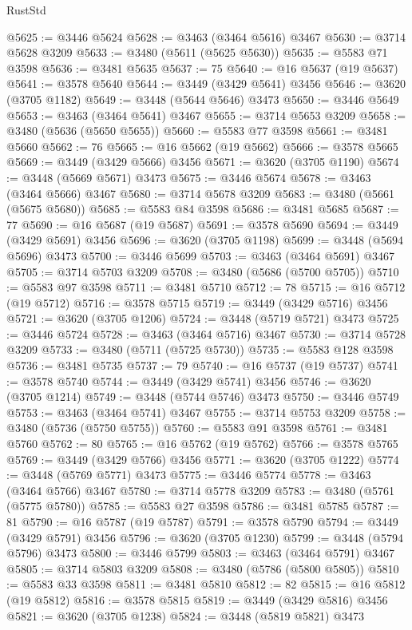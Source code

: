 \begin{lexlean}{RustStd}
\begin{coremodule}
{{{{{{{{{{{{{{{{{{{@5625 := @3446 @5624
@5628 := @3463 (@3464 @5616) @3467
@5630 := @3714 @5628 @3209
@5633 := @3480 (@5611 (@5625 @5630))
@5635 := @5583 @71 @3598
@5636 := @3481 @5635
@5637 := 75
@5640 := @16 @5637 (@19 @5637)
@5641 := @3578 @5640
@5644 := @3449 (@3429 @5641) @3456
@5646 := @3620 (@3705 @1182)
@5649 := @3448 (@5644 @5646) @3473
@5650 := @3446 @5649
@5653 := @3463 (@3464 @5641) @3467
@5655 := @3714 @5653 @3209
@5658 := @3480 (@5636 (@5650 @5655))
@5660 := @5583 @77 @3598
@5661 := @3481 @5660
@5662 := 76
@5665 := @16 @5662 (@19 @5662)
@5666 := @3578 @5665
@5669 := @3449 (@3429 @5666) @3456
@5671 := @3620 (@3705 @1190)
@5674 := @3448 (@5669 @5671) @3473
@5675 := @3446 @5674
@5678 := @3463 (@3464 @5666) @3467
@5680 := @3714 @5678 @3209
@5683 := @3480 (@5661 (@5675 @5680))
@5685 := @5583 @84 @3598
@5686 := @3481 @5685
@5687 := 77
@5690 := @16 @5687 (@19 @5687)
@5691 := @3578 @5690
@5694 := @3449 (@3429 @5691) @3456
@5696 := @3620 (@3705 @1198)
@5699 := @3448 (@5694 @5696) @3473
@5700 := @3446 @5699
@5703 := @3463 (@3464 @5691) @3467
@5705 := @3714 @5703 @3209
@5708 := @3480 (@5686 (@5700 @5705))
@5710 := @5583 @97 @3598
@5711 := @3481 @5710
@5712 := 78
@5715 := @16 @5712 (@19 @5712)
@5716 := @3578 @5715
@5719 := @3449 (@3429 @5716) @3456
@5721 := @3620 (@3705 @1206)
@5724 := @3448 (@5719 @5721) @3473
@5725 := @3446 @5724
@5728 := @3463 (@3464 @5716) @3467
@5730 := @3714 @5728 @3209
@5733 := @3480 (@5711 (@5725 @5730))
@5735 := @5583 @128 @3598
@5736 := @3481 @5735
@5737 := 79
@5740 := @16 @5737 (@19 @5737)
@5741 := @3578 @5740
@5744 := @3449 (@3429 @5741) @3456
@5746 := @3620 (@3705 @1214)
@5749 := @3448 (@5744 @5746) @3473
@5750 := @3446 @5749
@5753 := @3463 (@3464 @5741) @3467
@5755 := @3714 @5753 @3209
@5758 := @3480 (@5736 (@5750 @5755))
@5760 := @5583 @91 @3598
@5761 := @3481 @5760
@5762 := 80
@5765 := @16 @5762 (@19 @5762)
@5766 := @3578 @5765
@5769 := @3449 (@3429 @5766) @3456
@5771 := @3620 (@3705 @1222)
@5774 := @3448 (@5769 @5771) @3473
@5775 := @3446 @5774
@5778 := @3463 (@3464 @5766) @3467
@5780 := @3714 @5778 @3209
@5783 := @3480 (@5761 (@5775 @5780))
@5785 := @5583 @27 @3598
@5786 := @3481 @5785
@5787 := 81
@5790 := @16 @5787 (@19 @5787)
@5791 := @3578 @5790
@5794 := @3449 (@3429 @5791) @3456
@5796 := @3620 (@3705 @1230)
@5799 := @3448 (@5794 @5796) @3473
@5800 := @3446 @5799
@5803 := @3463 (@3464 @5791) @3467
@5805 := @3714 @5803 @3209
@5808 := @3480 (@5786 (@5800 @5805))
@5810 := @5583 @33 @3598
@5811 := @3481 @5810
@5812 := 82
@5815 := @16 @5812 (@19 @5812)
@5816 := @3578 @5815
@5819 := @3449 (@3429 @5816) @3456
@5821 := @3620 (@3705 @1238)
@5824 := @3448 (@5819 @5821) @3473
}}}}}}}}}}}}}}}}}}}
\end{coremodule}
\end{lexlean}
